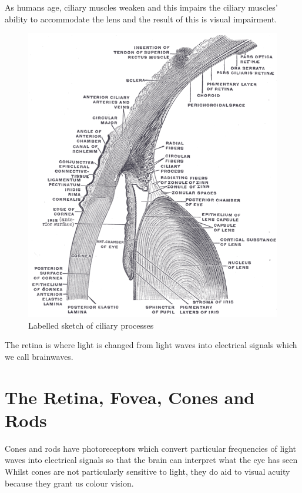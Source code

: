 As humans age, ciliary muscles weaken and this impairs the ciliary muscles'
ability to accommodate the lens and the result of this is visual impairment.
\cite{fisher1985ciliary}

\begin{figure}[htbp]
  \centering
    \includegraphics{figures/cilary_processes}
  \caption{Labelled sketch of ciliary processes}
  \label{fig:cilary_processes}
\end{figure}

The retina is where light is changed from light waves into electrical
signals which we call brainwaves.

\section{The Retina, Fovea, Cones and Rods}

Cones and rods have photoreceptors which convert particular frequencies of
light waves into electrical signals so that the brain can interpret what
the eye has seen Whilst cones are not particularly sensitive to light,
they do aid to visual acuity because they grant us colour vision.\cite{}

